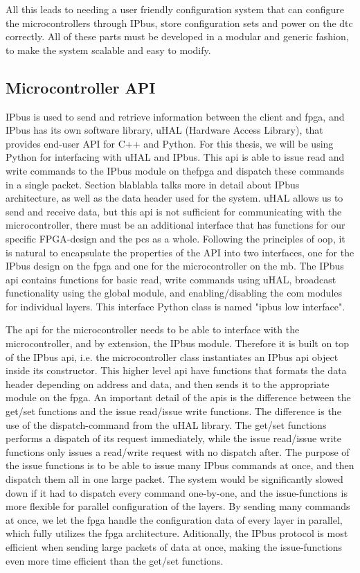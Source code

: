\documentclass[main.tex]{subfiles}
\begin{document}
All this leads to needing a user friendly configuration system that can configure the microcontrollers through IPbus, store configuration sets and power on the \gls{dtc} correctly. All of these parts must be developed in a modular and generic fashion, to make the system scalable and easy to modify.

\subsection{Microcontroller API}
\label{ssec: mcu_api}
IPbus is used to send and retrieve information between the client and \gls{fpga}, and IPbus has its own software library, uHAL (Hardware Access Library), that provides end-user API for C++ and Python. For this thesis, we will be using Python for interfacing with uHAL and IPbus. This \gls{api} is able to issue read and write commands to the IPbus module on the\gls{fpga} and dispatch these commands in a single packet. Section blablabla talks more in detail about IPbus architecture, as well as the data header used for the system. uHAL allows us to send and receive data, but this \gls{api} is not sufficient for communicating with the microcontroller, there must be an additional interface that has functions for our specific FPGA-design and the \gls{pcs} as a whole. Following the principles of \gls{oop}, it is natural to encapsulate the properties of the API into two interfaces, one for the IPbus design on the \gls{fpga} and one for the microcontroller on the \gls{mb}. The IPbus \gls{api} contains functions for basic read, write commands using uHAL, broadcast functionality using the global module, and enabling/disabling the com modules for individual layers. This interface Python class is named "ipbus low interface".

The \gls{api} for the microcontroller needs to be able to interface with the microcontroller, and by extension, the IPbus module. Therefore it is built on top of the IPbus \gls{api}, i.e. the microcontroller class instantiates an IPbus \gls{api} object inside its constructor. This higher level \gls{api} have functions that formats the data header depending on address and data, and then sends it to the appropriate module on the \gls{fpga}. An important detail of the \gls{api}s is the difference between the get/set functions and the issue read/issue write functions. The difference is the use of the dispatch-command from the uHAL library. The get/set functions performs a dispatch of its request immediately, while the issue read/issue write functions only issues a read/write request with no dispatch after. The purpose of the issue functions is to be able to issue many IPbus commands at once, and then dispatch them all in one large packet. The system would be significantly slowed down if it had to dispatch every command one-by-one, and the issue-functions is more flexible for parallel configuration of the layers. By sending many commands at once, we let the \gls{fpga} handle the configuration data of every layer in parallel, which fully utilizes the \gls{fpga} architecture. Aditionally, the IPbus protocol is most efficient when sending large packets of data at once, making the issue-functions even more time efficient than the get/set functions.
\end{document}
